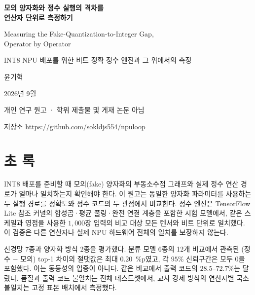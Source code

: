 \documentclass[11pt,a4paper,oneside]{report}
\begin{document}
\begin{titlepage}
\centering
\vspace*{50mm}
{\LARGE\bfseries 모의 양자화와 정수 실행의 격차를\\[4pt] 연산자 단위로 측정하기\par}
\vspace{10mm}
{\large Measuring the Fake-Quantization-to-Integer Gap,\\[2pt] Operator by Operator\par}
\vspace{6mm}
{\large INT8 NPU 배포를 위한 비트 정확 정수 엔진과 그 위에서의 측정\par}
\vfill
{\large 윤기혁\par}
\vspace{4mm}
{\large 2026년 9월\par}\vspace{3mm}
{\small 개인 연구 원고 · 학위 제출물 및 게재 논문 아님\par}
\vspace{10mm}
{\small 저장소 \url{https://github.com/sokldjs554/npuloop}\par}
\vspace{20mm}
\end{titlepage}

\setcounter{page}{1}

\chapter*{초 록}

INT8 배포를 준비할 때 모의(fake) 양자화의 부동소수점 그래프와 실제 정수 연산 경로가
얼마나 일치하는지 확인해야 한다. 이 원고는 동일한 양자화 파라미터를 사용하는 두 실행 경로를
정확도와 정수 코드의 두 관점에서 비교한다. 정수 엔진은 TensorFlow Lite 참조 커널의
합성곱·평균 풀링·완전 연결 계층을 포함한 시험 모델에서, 같은 스케일과 영점을 사용한
$1{,}000$장 입력의 비교 대상 모든 텐서와 비트 단위로 일치했다. 이 검증은 다른 연산자나
실제 NPU 하드웨어 전체의 일치를 보장하지 않는다.

신경망 7종과 양자화 방식 2종을 평가했다. 분류 모델 6종의 12개 비교에서 관측된
(정수 $-$ 모의) top-1 차이의 절댓값은 최대 $0.20$~\%p였고, 각 $95\%$ 신뢰구간은 모두
0을 포함했다. 이는 동등성의 입증이 아니다. 같은 비교에서 출력 코드의 $28.5$--$72.7\%$는
달랐다. 품질과 출력 코드 불일치는 전체 테스트셋에서, 교사 강제 방식의 연산자별 국소
불일치는 고정 표본 배치에서 측정했다.
\end{document}
